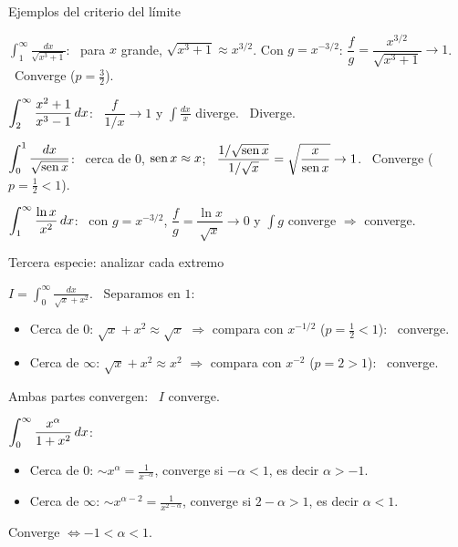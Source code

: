 \documentclass[10pt,aspectratio=169]{beamer}
\begin{document}
\begin{frame}{Ejemplos del criterio del límite}
  \small
  \begin{ejemplo}[6]
    $\displaystyle\int_1^\infty\frac{dx}{\sqrt{x^3+1}}$: \ para $x$ grande, $\sqrt{x^3+1}\approx x^{3/2}$. Con $g=x^{-3/2}$:
    $\dfrac{f}{g}=\dfrac{x^{3/2}}{\sqrt{x^3+1}}\to1$. \ Converge ($p=\frac32$).
  \end{ejemplo}
  \begin{ejemplo}[7]
    $\displaystyle\int_2^\infty\frac{x^2+1}{x^3-1}\,dx$: \ $\dfrac{f}{1/x}\to1$ y $\int\frac{dx}x$ diverge. \ Diverge.
  \end{ejemplo}
  \begin{ejemplo}
    $\displaystyle\int_0^1\frac{dx}{\sqrt{\operatorname{sen} x}}$: \ cerca de $0$, $\operatorname{sen} x\approx x$; \ $\dfrac{1/\sqrt{\operatorname{sen} x}}{1/\sqrt x}=\sqrt{\dfrac{x}{\operatorname{sen} x}}\to1$.
    \ Converge ($p=\frac12<1$).
  \end{ejemplo}
  \begin{ejemplo}[9: $L=0$]
    $\displaystyle\int_1^\infty\frac{\ln x}{x^2}\,dx$: \ con $g=x^{-3/2}$, $\dfrac fg=\dfrac{\ln x}{\sqrt x}\to0$ y $\int g$ converge $\Rightarrow$ converge.
  \end{ejemplo}
\end{frame}

\begin{frame}{Tercera especie: analizar cada extremo}
  \begin{ejemplo}[10]
    $\displaystyle I=\int_0^\infty\frac{dx}{\sqrt x+x^2}$. \ Separamos en $1$:
    \begin{itemize}
      \item Cerca de $0$: $\sqrt x+x^2\approx\sqrt x$ $\Rightarrow$ compara con $x^{-1/2}$ ($p=\frac12<1$): \ converge.
      \item Cerca de $\infty$: $\sqrt x+x^2\approx x^2$ $\Rightarrow$ compara con $x^{-2}$ ($p=2>1$): \ converge.
    \end{itemize}
    Ambas partes convergen: \ $I$ converge.
  \end{ejemplo}
  \begin{ejemplo}
    $\displaystyle\int_0^\infty\frac{x^{\alpha}}{1+x^2}\,dx$:
    \begin{itemize}
      \item Cerca de $0$: $\sim x^{\alpha}=\frac1{x^{-\alpha}}$, converge si $-\alpha<1$, es decir $\alpha>-1$.
      \item Cerca de $\infty$: $\sim x^{\alpha-2}=\frac1{x^{2-\alpha}}$, converge si $2-\alpha>1$, es decir $\alpha<1$.
    \end{itemize}
    Converge $\iff -1<\alpha<1$.
  \end{ejemplo}
\end{frame}
\end{document}
